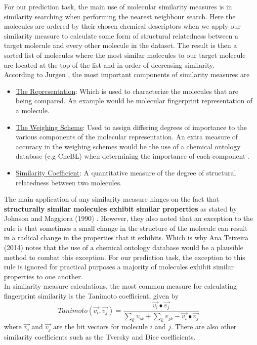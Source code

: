 \documentclass[a4paper,12pt]{report}
\begin{document}
			For our prediction task, the main use of molecular similarity measures is in similarity searching when performing the nearest neighbour search. Here the molecules are ordered by their chosen chemical descriptors when we apply our similarity measure to calculate some form of structural relatedness between a target molecule and every other molecule in the dataset. The result is then a sorted list of molecules where the most similar molecules to our target molecule are located at the top of the list and in order of decreasing similarity.\\
			According to Jurgen \cite{Jurgen2004}, the most important components of similarity measures are
				\begin{itemize}
					\item \underline{The Representation}: Which is used to characterize the molecules that are being compared. An example would be molecular fingerprint representation of a molecule.
					\item \underline{The Weighing Scheme}: Used to assign differing degrees of importance to the various components of the molecular representation. An extra measure of accuracy in the weighing schemes would be the use of a chemical ontology database (e.g CheBL) when determining the importance of each component \cite{AnaPhd2014}.
					\item \underline{Similarity Coefficient}: A quantitative measure of the degree of structural relatedness between two molecules.
				\end{itemize}
			The main application of any similarity measure hinges on the fact that \textbf{structurally similar molecules exhibit similar properties} as stated by Johnson and Maggiora (1990) \cite{JohnMaggiora1990}. However, they also noted that an exception to the rule is that sometimes a small change in the structure of the molecule can result in a radical change in the properties that it exhibits. Which is why Ana Teixeira (2014) \cite{AnaPhd2014} notes that the use of a chemical ontology database would be a plausible method to combat this exception. For our prediction task, the exception to this rule is ignored for practical purposes a majority of molecules exhibit similar properties to one another.\\
			In similarity measure calculations, the most common measure for calculating fingerprint similarity is the Tanimoto coefficient, given by 
				\begin{equation}
				Tanimoto(\vec{v_i}, \vec{v_j}) = 
				\frac{\vec{v_i}\bullet\vec{v_j}}
				{\sum_{k}v_{ik} + \sum_{k}v_{jk} - \vec{v_i}\bullet\vec{v_j}  } 
				\end{equation}
			where $\vec{v_i}$ and $\vec{v_j}$ are the bit vectors for molecule $i$ and $j$. There are also other similarity coefficients such as the Tversky and Dice coefficients.
	
\end{document}
